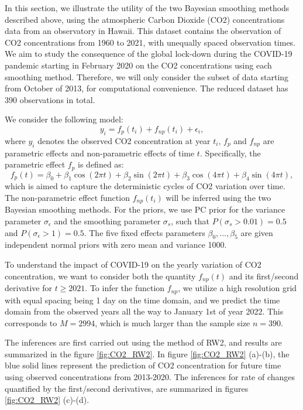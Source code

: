 \documentclass{article}
\begin{document}
In this section, we illustrate the utility of the two Bayesian smoothing methods described above, using the atmospheric Carbon Dioxide (CO2) concentrations data from an observatory in Hawaii. This dataset contains the observation of CO2 concentrations from 1960 to 2021, with unequally spaced observation times. We aim to study the consequence of the global lock-down during the COVID-19 pandemic starting in February 2020 on the CO2 concentrations using each smoothing method. Therefore, we will only consider the subset of data starting from October of 2013, for computational convenience. The reduced dataset has 390 observations in total.

We consider the following model: $$y_i = f_{p}(t_i) + f_{np}(t_i) + \epsilon_i,$$ where $y_i$ denotes the observed CO2 concentration at year $t_i$, $f_{p}$ and $f_{np}$ are parametric effects and non-parametric effects of time $t$. Specifically, the parametric effect $f_{p}$ is defined as: $$f_{p}(t) = \beta_0 + \beta_1 \cos(2\pi t) + \beta_2 \sin(2 \pi t) + \beta_3 \cos(4\pi t) + \beta_4 \sin(4\pi t),$$ which is aimed to capture the deterministic cycles of CO2 variation over time. The non-parametric effect function $f_{np}(t_i)$ will be inferred using the two Bayesian smoothing methods. For the priors, we use PC prior for the variance parameter $\sigma_\epsilon$ and the smoothing parameter $\sigma_s$, such that $P(\sigma_s > 0.01) = 0.5$ and $P(\sigma_\epsilon > 1) = 0.5$. The five fixed effects parameters $\beta_0, ..., \beta_5$ are given independent normal priors with zero mean and variance 1000.  

To understand the impact of COVID-19 on the yearly variation of CO2 concentration, we want to consider both the quantity $f_{np}(t)$ and its first/second derivative for $t \geq 2021$. To infer the function $f_{np}$, we utilize a high resolution grid with equal spacing being 1 day on the time domain, and we predict the time domain from the observed years all the way to January 1st of year 2022. This corresponds to $M = 2994$, which is much larger than the sample size $n = 390$.

The inferences are first carried out using the method of RW2, and results are summarized in the figure \ref{fig:CO2_RW2}. In figure \ref{fig:CO2_RW2} (a)-(b), the blue solid lines represent the prediction of CO2 concentration for future time using observed concentrations from 2013-2020. The inferences for rate of changes quantified by the first/second derivatives, are summarized in figures \ref{fig:CO2_RW2} (c)-(d).
\end{document}
